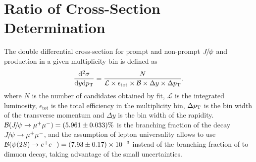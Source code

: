 \section{Ratio of Cross-Section Determination}
\label{RCS}
\def\effTot{\ensuremath{\epsilon_{\mathrm{tot}}}\xspace}
\def\effTotJ{\ensuremath{\epsilon_{\mathrm{tot,\jpsi}}}\xspace}
\def\effTotP{\ensuremath{\epsilon_{\mathrm{tot,\psitwos}}}\xspace}
\def\effAcc{\ensuremath{\epsilon_{\mathrm{acc}}}\xspace}
\def\effReco{\ensuremath{\epsilon_{\mathrm{Reco\&Sel}}}\xspace}
\def\effID{\ensuremath{\epsilon_{\mathrm{MuonID}}}\xspace}
\def\effTrigger{\ensuremath{\epsilon_{\mathrm{Trigger}}}\xspace}
The double differential cross-section for prompt and non-prompt ${{J\mskip -3mu/\mskip -2mu\psi}}$ and \psitwos production in a given multiplicity bin is defined as
\begin{equation}
    \frac{\deriv^2\sigma}{\deriv y\deriv \pt}
    = \frac{N}
           {\mathcal{L}\times\effTot\times \BR \times\Delta y \times \Delta \pt}.
  \label{CrossSecJ}
\end{equation}
where $N$ is the number of candidates obtained by fit, $\mathcal{L}$ is the integrated luminosity, \effTot is the total efficiency in the multiplicity bin, $\Delta p_{\mathrm{T}}$ is the bin width of the transverse momentum and $\Delta y$ is the bin width of the rapidity. ${\mathcal{B}}({{J\mskip -3mu/\mskip -2mu\psi}}\rightarrow\mu^+\mu^-)=(5.961\pm0.033)\%$ is the branching fraction of the decay ${{J\mskip -3mu/\mskip -2mu\psi}}\rightarrow \mu^+ \mu^-$, and the assumption of lepton universality allows to use  ${\mathcal{B}}({\psi{(2S)}}\rightarrow e^+e^-)=(7.93\pm0.17)\times10^{-3}$ instead of the branching fraction of \psitwos to dimuon decay, taking advantage of the small uncertainties. 

